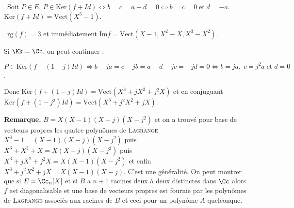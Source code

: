 {{\textbullet~Soit $P\in E$. $P\in\text{Ker}(f+Id)\Leftrightarrow b=c=a+d = 0\Leftrightarrow b=c=0\;\text{et}\;d=-a$. $\text{Ker}(f+Id)= \text{Vect}(X^3-1)$.

\textbullet~$\text{rg}(f) = 3$ et immédiatement $\text{Im}f =\text{Vect}(X-1,X^2-X,X^3-X^2)$.

Si $\Kk=\Cc$, on peut continuer :

$P\in\text{Ker}(f+(1-j)Id)\Leftrightarrow b-ja = c-jb = a + d - jc = - jd = 0\Leftrightarrow b = ja,\;c = j^2a\;\text{et}\;d=0$.

Donc  
$\text{Ker}(f+(1-j)Id)=\text{Vect}(X^3+jX^2+j^2X)$ et en conjuguant $\text{Ker}(f+(1-j^2)Id) =\text{Vect}(X^3+j^2X^2+jX)$.

\textbf{Remarque.} $B =X(X-1)(X-j)(X-j^2)$ et on a trouvé pour base de vecteurs propres les quatre polynômes de \textsc{Lagrange} $X^3-1 = (X-1)(X-j)(X-j^2)$ puis $X^3+X^2+X = X(X-j)(X-j^2)$ puis $X^3+jX^2+j^2X =X(X-1)(X-j^2)$ et enfin $X^3+j^2X^2+jX = X(X-1)(X-j )$. C'est une généralité. On peut montrer que si $E =\Cc_n[X]$ et si $B$ a $n+1$ racines deux à deux distinctes dans $\Cc$ alors $f$ est diagonalisable et une base de vecteurs propres est fournie par les polynômes de \textsc{Lagrange} associés aux racines de $B$ et ceci pour un polynôme $A$ quelconque.
}
}
